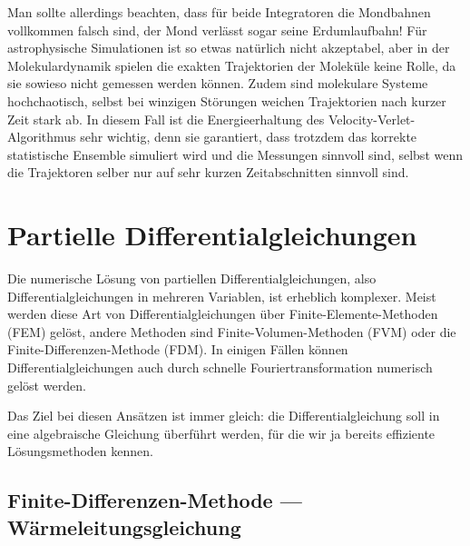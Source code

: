 Man sollte allerdings beachten, dass für beide Integratoren die
Mondbahnen vollkommen falsch sind, der Mond verlässt sogar seine
Erdumlaufbahn! Für astrophysische Simulationen ist so etwas natürlich
nicht akzeptabel, aber in der Molekulardynamik spielen die exakten
Trajektorien der Moleküle keine Rolle, da sie sowieso nicht gemessen
werden können. Zudem sind molekulare Systeme hochchaotisch, \dh
selbst bei winzigen Störungen weichen Trajektorien nach kurzer Zeit
stark ab. In diesem Fall ist die Energieerhaltung des
Velocity-Verlet-Algorithmus sehr wichtig, denn sie garantiert, dass
trotzdem das korrekte statistische Ensemble simuliert wird und die
Messungen sinnvoll sind, selbst wenn die Trajektoren selber nur auf
sehr kurzen Zeitabschnitten sinnvoll sind.

\section{Partielle Differentialgleichungen}

Die numerische Lösung von partiellen Differentialgleichungen, also
Differentialgleichungen in mehreren Variablen, ist erheblich
komplexer. Meist werden diese Art von Differentialgleichungen über
Finite-Elemente-Methoden (FEM) gelöst, andere Methoden sind
Finite-Volumen-Methoden (FVM) oder die Finite-Differenzen-Methode
(FDM). In einigen Fällen können Differentialgleichungen auch durch
schnelle Fouriertransformation numerisch gelöst werden.

Das Ziel bei diesen Ansätzen ist immer gleich: die Differentialgleichung
soll in eine algebraische Gleichung überführt werden, für die wir ja bereits effiziente Lösungsmethoden kennen.

\subsection{Finite-Differenzen-Methode --- Wärmeleitungsgleichung}

